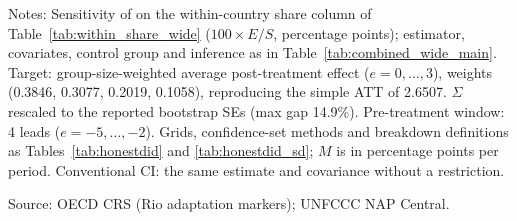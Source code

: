 \begin{table}[H]
\centering
\caption{HonestDiD robust 95\% CI for the within-country adaptation share}
\label{tab:honestdid_within}
\par\vspace{4pt}
\begin{minipage}{\linewidth}\footnotesize
Notes: Sensitivity of \citet{rambachan_roth_2023} on the within-country share column of Table~\ref{tab:within_share_wide} ($100 \times E/S$, percentage points); estimator, covariates, control group and inference as in Table~\ref{tab:combined_wide_main}. Target: group-size-weighted average post-treatment effect ($e=0,\dots,3$), weights (0.3846, 0.3077, 0.2019, 0.1058), reproducing the simple ATT of 2.6507. $\Sigma$ rescaled to the reported bootstrap SEs (max gap 14.9\%). Pre-treatment window: 4 leads ($e=-5,\dots,-2$). Grids, confidence-set methods and breakdown definitions as Tables~\ref{tab:honestdid} and \ref{tab:honestdid_sd}; $M$ is in percentage points per period. Conventional CI: the same estimate and covariance without a restriction.\par
Source: OECD CRS (Rio adaptation markers); UNFCCC NAP Central.
\end{minipage}
\end{table}
